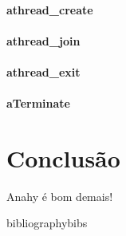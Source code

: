 \documentclass[12pt]{article} usepackage{sbc-template} usepackage{graphicx,url}
\begin{document}
\paragraph{athread_create}

\paragraph{athread_join}

\paragraph{athread_exit}

\paragraph{aTerminate}


\section{Conclusão} %

Anahy é bom demais!


 bibliography{bibs}
\end{document}
